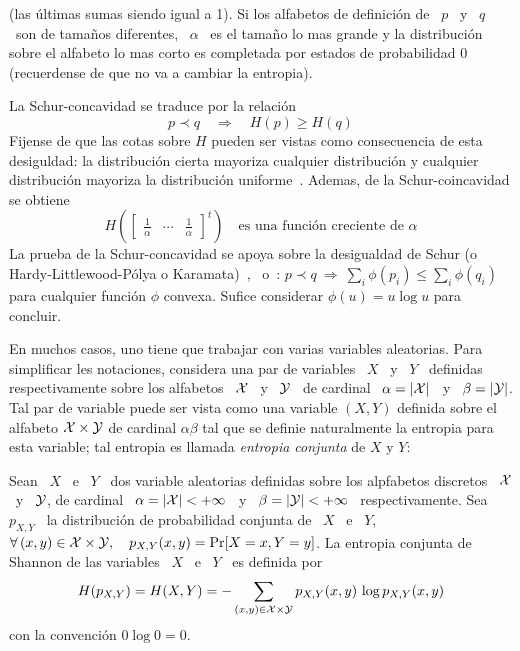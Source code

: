 \begin{propiedades}
\begin{definicion}[Mayorizaci\'on]
\[    \]
    (las \'ultimas sumas siendo igual a 1).  Si los alfabetos de definici\'on de
    \ $p$ \ y  \ $q$ \ son de tama\~nos diferentes, \  $\alpha$ \ es el tama\~no
    lo  mas  grande y  la  distribuci\'on  sobre el  alfabeto  lo  mas corto  es
    completada por estados de probabilidad 0 (recuerdense de que no va a cambiar
    la entropia).
  \end{definicion}
  La  Schur-concavidad  se  traduce  por  la  relaci\'on
  \[
  p \prec  q \quad \Rightarrow  \quad H(p) \ge  H(q)
  \]
  Fijense de que las cotas sobre $H$ pueden ser vistas como consecuencia de esta
  desiguldad:  la  distribuci\'on  cierta  mayoriza cualquier  distribuci\'on  y
  cualquier  distribuci\'on   mayoriza  la  distribuci\'on  uniforme~\cite[p.~9,
  (6)-(8)]{MarOlk11}.  Ademas, de la Schur-coincavidad se obtiene
  \[
  H\left( \begin{bmatrix}  \frac1\alpha & \cdots  & \frac1\alpha \end{bmatrix}^t
  \right) \quad \mbox{es una funci\'on creciente de } \alpha
  \]
  La prueba  de la Schur-concavidad  se apoya sobre  la desigualdad de  Schur (o
  Hardy-Littlewood-P\'olya    o    Karamata)~\cite{Sch23,    HarLit29,    Kar32,
    HarLit52},~\cite[Cap.~3,                                 Prop.~C.1]{MarOlk11}
  o~\cite[Teorema~II.3.1]{Bha97}: $p \prec q  \: \Rightarrow \: \sum_i \phi(p_i)
  \le  \sum_i  \phi(q_i)$  para  cualquier  funci\'on  $\phi$  convexa.   Sufice
  considerar $\phi(u) = u \log u$ para concluir.
\end{propiedades}
%


En muchos  casos, uno tiene que  trabajar con varias  variables aleatorias. Para
simplificar les  notaciones, considera una par  de variables \  $X$ \ y \  $Y$ \
definidas respectivamente sobre los alfabetos \ $\mathcal{X}$  \ y \ $\mathcal{Y}$ \ de cardinal \
$\alpha = |\mathcal{X}|$ \ y \ $\beta =  |\mathcal{Y}|$.  Tal par de variable puede ser vista como
una  variable $(X,Y)$  definida sobre  el alfabeto  $\mathcal{X} \times  \mathcal{Y}$  de cardinal
$\alpha \beta$ tal  que se definie naturalmente la  entropia para esta variable;
tal entropia es llamada {\it entropia conjunta} de $X$ y $Y$:
%
\begin{definicion}\label{def:SZ:EntropiaConjunta}
  Sean \ $X$ \ e \ $Y$  \ dos variable aleatorias definidas sobre los alpfabetos
  discretos \  $\mathcal{X}$ \ y \ $\mathcal{Y}$,  de cardinal \ $\alpha  = |\mathcal{X}| < +\infty$  \ y \
  $\beta  =   |\mathcal{Y}|  <  +\infty$  \   respectivamente.  Sea  \   $p_{X,Y}$  \  la
  distribuci\'on de probabilidad conjunta de \ $X$ \ e \ $Y$, \ \ie $ \forall \,
  (x,y) \in \mathcal{X} \times \mathcal{Y}, \quad p_{X,Y}(x,y) =  \Pr[X = x , Y = y]$. La entropia
  conjunta de Shannon de las variables \ $X$ \ e \ $Y$ \ es definida por
  \[
  H(p_{X,Y}) =  H(X,Y) = -  \sum_{(x,y) \in \mathcal{X}  \times \mathcal{Y}} p_{X,Y}(x,y)  \, \log
  p_{X,Y}(x,y)
  \]
  con la convenci\'on $0 \log 0 = 0$.
\end{definicion}

